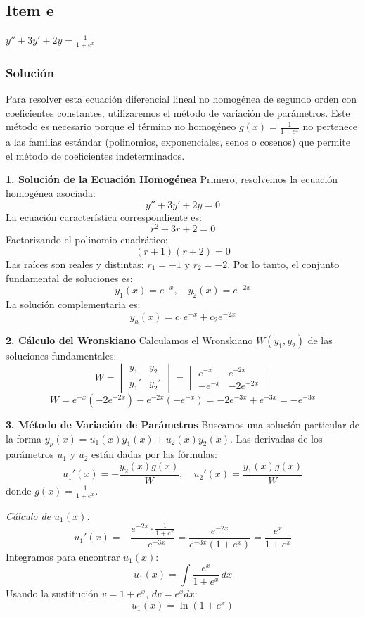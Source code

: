 \documentclass[a4paper]{article}
\begin{document}
\subsection{Item e}
$y'' + 3y' + 2y = \frac{1}{1+e^x}$

\subsubsection{Solución}
Para resolver esta ecuación diferencial lineal no homogénea de segundo orden con coeficientes constantes, utilizaremos el método de variación de parámetros. Este método es necesario porque el término no homogéneo $g(x) = \frac{1}{1+e^x}$ no pertenece a las familias estándar (polinomios, exponenciales, senos o cosenos) que permite el método de coeficientes indeterminados.

\textbf{1. Solución de la Ecuación Homogénea}
Primero, resolvemos la ecuación homogénea asociada:
$$
y'' + 3y' + 2y = 0
$$
La ecuación característica correspondiente es:
$$
r^2 + 3r + 2 = 0
$$
Factorizando el polinomio cuadrático:
$$
(r + 1)(r + 2) = 0
$$
Las raíces son reales y distintas: $r_1 = -1$ y $r_2 = -2$. Por lo tanto, el conjunto fundamental de soluciones es:
$$
y_1(x) = e^{-x}, \quad y_2(x) = e^{-2x}
$$
La solución complementaria es:
$$
y_h(x) = c_1 e^{-x} + c_2 e^{-2x}
$$

\textbf{2. Cálculo del Wronskiano}
Calculamos el Wronskiano $W(y_1, y_2)$ de las soluciones fundamentales:
$$
W = \begin{vmatrix} y_1 & y_2 \\ y_1' & y_2' \end{vmatrix} = \begin{vmatrix} e^{-x} & e^{-2x} \\ -e^{-x} & -2e^{-2x} \end{vmatrix}
$$
$$
W = e^{-x}(-2e^{-2x}) - e^{-2x}(-e^{-x}) = -2e^{-3x} + e^{-3x} = -e^{-3x}
$$

\textbf{3. Método de Variación de Parámetros}
Buscamos una solución particular de la forma $y_p(x) = u_1(x)y_1(x) + u_2(x)y_2(x)$. Las derivadas de los parámetros $u_1$ y $u_2$ están dadas por las fórmulas:
$$
u_1'(x) = -\frac{y_2(x) g(x)}{W}, \quad u_2'(x) = \frac{y_1(x) g(x)}{W}
$$
donde $g(x) = \frac{1}{1+e^x}$.

\textit{Cálculo de $u_1(x)$:}
$$
u_1'(x) = -\frac{e^{-2x} \cdot \frac{1}{1+e^x}}{-e^{-3x}} = \frac{e^{-2x}}{e^{-3x}(1+e^x)} = \frac{e^x}{1+e^x}
$$
Integramos para encontrar $u_1(x)$:
$$
u_1(x) = \int \frac{e^x}{1+e^x} \, dx
$$
Usando la sustitución $v = 1+e^x$, $dv = e^x dx$:
$$
u_1(x) = \ln(1+e^x)
$$
\end{document}
